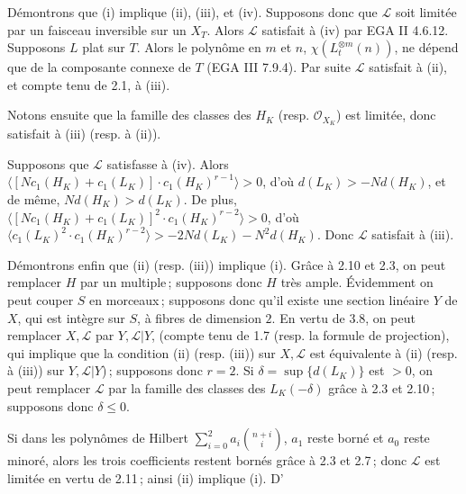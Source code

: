 D\'
emontrons que (i) implique (ii), (iii), et (iv). Supposons donc que \(\mathcal L\) soit limit\'ee par un faisceau inversible sur un \(X_T\). Alors \(\mathcal L\) satisfait \`a (iv) par EGA II 4.6.12. Supposons \(L\) plat sur \(T\). Alors le polyn\^ome en \(m\) et \(n\), \(\chi(L_t^{\otimes m}(n))\), ne d\'epend que de la composante connexe de \(T\) (EGA III 7.9.4). Par suite \(\mathcal L\) satisfait \`a (ii), et compte tenu de 2.1, \`a (iii).

Notons ensuite que la famille des classes des \(H_K\) (resp. \(\mathcal O_{X_K}\)) est limit\'ee, donc satisfait \`a (iii) (resp. \`a (ii)).

Supposons que \(\mathcal L\) satisfasse \`a (iv). Alors \(\langle [N c_1(H_K)+c_1(L_K)]\cdot c_1(H_K)^{r-1}\rangle>0\), d'o\`u \(d(L_K)>-Nd(H_K)\), et de m\^eme, \(Nd(H_K)>d(L_K)\). De plus, \(\langle [N c_1(H_K)+c_1(L_K)]^2\cdot c_1(H_K)^{r-2}\rangle>0\), d'o\`u \(\langle c_1(L_K)^2\cdot c_1(H_K)^{r-2}\rangle>-2Nd(L_K)-N^2d(H_K)\). Donc \(\mathcal L\) satisfait \`a (iii).

D\'emontrons enfin que (ii) (resp. (iii)) implique (i). Gr\^ace \`a 2.10 et 2.3, on peut remplacer \(H\) par un multiple\,; supposons donc \(H\) tr\`es ample. \'Evidemment on peut couper \(S\) en morceaux\,; supposons donc qu'il existe une section lin\'eaire \(Y\) de \(X\), qui est int\`egre sur \(S\), \`a fibres de dimension \(2\). En vertu de 3.8, on peut remplacer \(X,\mathcal L\) par \(Y,\mathcal L|Y\), (compte tenu de 1.7 (resp. la formule de projection), qui implique que la condition (ii) (resp. (iii)) sur \(X,\mathcal L\) est \'equivalente \`a (ii) (resp. \`a (iii)) sur \(Y,\mathcal L|Y\))\,; supposons donc \(r=2\). Si \(\delta=\sup\{d(L_K)\}\) est \(>0\), on peut remplacer \(\mathcal L\) par la famille des classes des \(L_K(-\delta)\) gr\^ace \`a 2.3 et 2.10\,; supposons donc \(\delta\le0\).

Si dans les polyn\^omes de Hilbert \(\sum_{i=0}^{2}a_i\binom{n+i}{i}\), \(a_1\) reste born\'e et \(a_0\) reste minor\'e, alors les trois coefficients restent born\'es gr\^ace \`a 2.3 et 2.7\,; donc \(\mathcal L\) est limit\'ee en vertu de 2.11\,; ainsi (ii) implique (i). D'%
